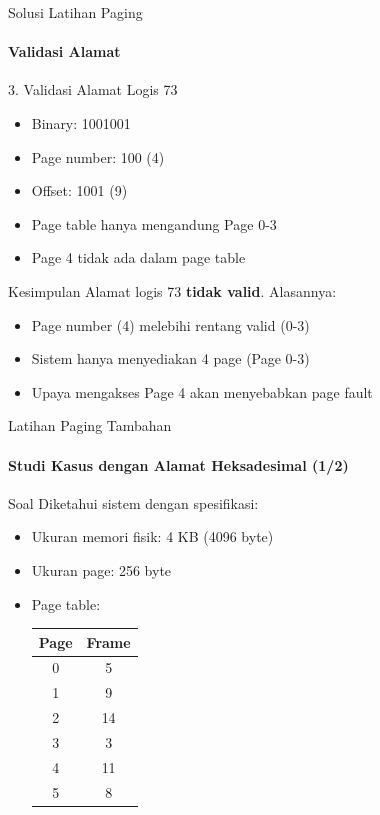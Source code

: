 \documentclass[10pt,aspectratio=169]{beamer}
\begin{document}
\begin{frame}{Solusi Latihan Paging}
    \framesubtitle{Validasi Alamat}
    
    \begin{block}{3. Validasi Alamat Logis 73}
        \begin{itemize}
            \item Binary: 1001001
            \item Page number: 100 (4)
            \item Offset: 1001 (9)
            \item Page table hanya mengandung Page 0-3
            \item Page 4 tidak ada dalam page table
        \end{itemize}
    \end{block}
    
    \begin{alertblock}{Kesimpulan}
        Alamat logis 73 \textbf{tidak valid}. Alasannya:
        \begin{itemize}
            \item Page number (4) melebihi rentang valid (0-3)
            \item Sistem hanya menyediakan 4 page (Page 0-3)
            \item Upaya mengakses Page 4 akan menyebabkan page fault
        \end{itemize}
    \end{alertblock}
\end{frame}

\begin{frame}{Latihan Paging Tambahan}
    \framesubtitle{Studi Kasus dengan Alamat Heksadesimal (1/2)}
    
    \begin{block}{Soal}
        Diketahui sistem dengan spesifikasi:
        \begin{itemize}
            \item Ukuran memori fisik: 4 KB (4096 byte)
            \item Ukuran page: 256 byte
            \item Page table: 
            \begin{center}
            \begin{tabular}{|c|c|}
            \hline
            \textbf{Page} & \textbf{Frame} \\
            \hline
            0 & 5 \\
            \hline
            1 & 9 \\
            \hline
            2 & 14 \\
            \hline
            3 & 3 \\
            \hline
            4 & 11 \\
            \hline
            5 & 8 \\
            \hline
            \end{tabular}
            \end{center}
        \end{itemize}
    \end{block}
\end{frame}
\end{document}
